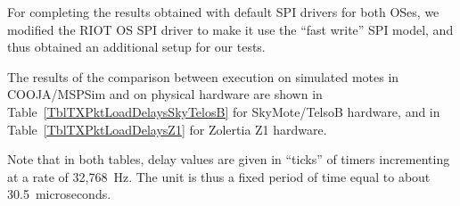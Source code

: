 \documentclass[10pt]{ewsn-proc}
\begin{document}
For completing the results obtained with default SPI drivers for both OSes,
we modified the RIOT OS SPI driver to make it use the ``fast write''
SPI model, and thus obtained an additional setup for our tests.

The results of the comparison between execution on simulated motes
in COOJA/MSPSim and on physical hardware are shown in
Table~\ref{TblTXPktLoadDelaysSkyTelosB} for SkyMote/TelsoB hardware,
and in Table~\ref{TblTXPktLoadDelaysZ1} for Zolertia Z1 hardware.

Note that in both tables, delay values are given in ``ticks'' of timers
incrementing at a rate of 32,768~Hz. The unit is thus a fixed period of
time equal to about 30.5~microseconds.


\newcommand{\tabtitle}[1]{\multicolumn{8}{c}{\bfseries #1}}
\newcommand{\ticks}[1]{#1 ticks}
\newcommand{\moy}[1]{#1}
\newcommand{\ect}[1]{#1}
\newcommand{\estus}[1]{($\approx$ #1 $\mu$sec.)}
\newcommand{\prctv}[1]{$\approx$ #1\% exp. value}
\end{document}

